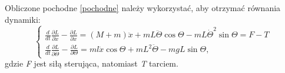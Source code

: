 Obliczone pochodne \ref{pochodne} należy wykorzystać, aby otrzymać równania dynamiki:
\begin{equation}
    \label{rDyna}
    \begin{cases}
    \frac{d}{dt}\frac{\partial L}{\partial \dot{x}}-\frac{\partial L}{\partial x}= (M+m)\ddot{x}+mL\ddot{\Theta}\cos{\Theta}-mL\dot{\Theta}^2\sin{\Theta}=F-T \\
    \frac{d}{dt}\frac{\partial L}{\partial \dot{\Theta}}-\frac{\partial L}{\partial \Theta}=ml\ddot{x}\cos{\Theta}+mL^2\ddot{\Theta}-mgL\sin{\Theta},
    \end{cases}
\end{equation}
gdzie \textit{F} jest siłą sterująca, natomiast \textit{T} tarciem.